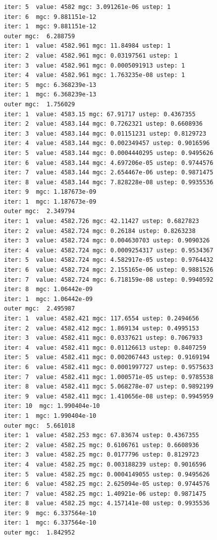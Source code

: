 \documentclass[
  letterpaper,
  DIV=11,
  numbers=noendperiod]{scrartcl}
\begin{document}
\begin{verbatim}
iter: 5  value: 4582 mgc: 3.091261e-06 ustep: 1 
iter: 6  mgc: 9.881151e-12 
iter: 1  mgc: 9.881151e-12 
outer mgc:  6.288759 
iter: 1  value: 4582.961 mgc: 11.84984 ustep: 1 
iter: 2  value: 4582.961 mgc: 0.03197561 ustep: 1 
iter: 3  value: 4582.961 mgc: 0.0005091913 ustep: 1 
iter: 4  value: 4582.961 mgc: 1.763235e-08 ustep: 1 
iter: 5  mgc: 6.368239e-13 
iter: 1  mgc: 6.368239e-13 
outer mgc:  1.756029 
iter: 1  value: 4583.15 mgc: 67.91717 ustep: 0.4367355 
iter: 2  value: 4583.144 mgc: 0.7262321 ustep: 0.6608936 
iter: 3  value: 4583.144 mgc: 0.01151231 ustep: 0.8129723 
iter: 4  value: 4583.144 mgc: 0.002349457 ustep: 0.9016596 
iter: 5  value: 4583.144 mgc: 0.0004440295 ustep: 0.9495626 
iter: 6  value: 4583.144 mgc: 4.697206e-05 ustep: 0.9744576 
iter: 7  value: 4583.144 mgc: 2.654467e-06 ustep: 0.9871475 
iter: 8  value: 4583.144 mgc: 7.828228e-08 ustep: 0.9935536 
iter: 9  mgc: 1.187673e-09 
iter: 1  mgc: 1.187673e-09 
outer mgc:  2.349794 
iter: 1  value: 4582.726 mgc: 42.11427 ustep: 0.6827823 
iter: 2  value: 4582.724 mgc: 0.26184 ustep: 0.8263238 
iter: 3  value: 4582.724 mgc: 0.004630703 ustep: 0.9090326 
iter: 4  value: 4582.724 mgc: 0.0009254317 ustep: 0.9534367 
iter: 5  value: 4582.724 mgc: 4.582917e-05 ustep: 0.9764432 
iter: 6  value: 4582.724 mgc: 2.155165e-06 ustep: 0.9881526 
iter: 7  value: 4582.724 mgc: 6.718159e-08 ustep: 0.9940592 
iter: 8  mgc: 1.06442e-09 
iter: 1  mgc: 1.06442e-09 
outer mgc:  2.495987 
iter: 1  value: 4582.421 mgc: 117.6554 ustep: 0.2494656 
iter: 2  value: 4582.412 mgc: 1.869134 ustep: 0.4995153 
iter: 3  value: 4582.411 mgc: 0.0337621 ustep: 0.7067933 
iter: 4  value: 4582.411 mgc: 0.01126613 ustep: 0.8407259 
iter: 5  value: 4582.411 mgc: 0.002067443 ustep: 0.9169194 
iter: 6  value: 4582.411 mgc: 0.0001997727 ustep: 0.9575633 
iter: 7  value: 4582.411 mgc: 1.000571e-05 ustep: 0.9785538 
iter: 8  value: 4582.411 mgc: 5.068278e-07 ustep: 0.9892199 
iter: 9  value: 4582.411 mgc: 1.410656e-08 ustep: 0.9945959 
iter: 10  mgc: 1.990404e-10 
iter: 1  mgc: 1.990404e-10 
outer mgc:  5.661018 
iter: 1  value: 4582.253 mgc: 67.83674 ustep: 0.4367355 
iter: 2  value: 4582.25 mgc: 0.6106761 ustep: 0.6608936 
iter: 3  value: 4582.25 mgc: 0.0177796 ustep: 0.8129723 
iter: 4  value: 4582.25 mgc: 0.003188239 ustep: 0.9016596 
iter: 5  value: 4582.25 mgc: 0.0004149055 ustep: 0.9495626 
iter: 6  value: 4582.25 mgc: 2.625094e-05 ustep: 0.9744576 
iter: 7  value: 4582.25 mgc: 1.40921e-06 ustep: 0.9871475 
iter: 8  value: 4582.25 mgc: 4.157141e-08 ustep: 0.9935536 
iter: 9  mgc: 6.337564e-10 
iter: 1  mgc: 6.337564e-10 
outer mgc:  1.842952 

\end{verbatim}
\end{document}
